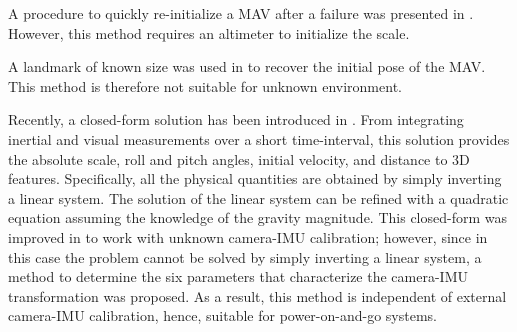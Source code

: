 \documentclass[letterpaper, 10 pt, journal, final]{ieeeconf}  %
\begin{document}


A procedure to quickly re-initialize a MAV after a failure was presented in \cite{Faessler2015}.
However, this method requires an altimeter to initialize the scale.

A landmark of known size was used in \cite{Gemeiner2007} to recover the initial pose of the MAV.
This method is therefore not suitable for unknown environment.

Recently, a closed-form solution has been introduced in \cite{Martinelli2012}.
From integrating inertial and visual measurements over a short time-interval, this solution provides the absolute scale, roll and pitch angles, initial velocity, and distance to 3D features.
Specifically, all the physical quantities are obtained by simply inverting a linear system.
The solution of the linear system can be refined with a quadratic equation assuming the knowledge of the gravity magnitude.
This closed-form was improved in \cite{Li2013} to work with unknown camera-IMU calibration;
however, since in this case the problem cannot be solved by simply inverting a linear system, a method to determine the six parameters that characterize the camera-IMU transformation was proposed.
As a result, this method is independent of external camera-IMU calibration, hence, suitable for power-on-and-go systems.
\end{document}
